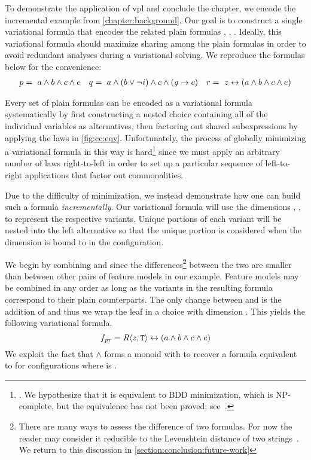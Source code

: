 \label{section:vpl:example}
%
To demonstrate the application of \ac{vpl} and conclude the chapter, we encode
the incremental example from \autoref{chapter:background}. Our goal is to
construct a single variational formula that encodes the related plain formulas
\pV{}, \qV{}, \rV{}. Ideally, this variational formula should maximize sharing
among the plain formulas in order to avoid redundant analyses during a
variational solving. We reproduce the formulas below for the convenience:
%
\begin{align*}
  p =\ a \wedge b \wedge c \wedge e && q=\ a \wedge (b \vee \neg \mathit{i}{}) \wedge c \wedge (\mathit{g}{} \rightarrow c) && r =~z \leftrightarrow (a \wedge b \wedge c \wedge e)
\end{align*}

%
Every set of plain formulas can be encoded as a variational formula
systematically by first constructing a nested choice containing all of the
individual variables as alternatives, then factoring out shared subexpressions
by applying the laws in \autoref{fig:cc:eqv}.
%
Unfortunately, the process of globally minimizing a variational formula in this
way is hard\footnote{\label{vpl:bdd}. We hypothesize that it is equivalent to
  BDD minimization, which is NP-complete, but the equivalence has not been
  proved; see~\cite{Walk14onward}.} since we must apply an arbitrary number of
laws right-to-left in order to set up a particular sequence of left-to-right
applications that factor out commonalities.

Due to the difficulty of minimization, we instead demonstrate how one can build
such a formula \emph{incrementally}.
%
Our variational formula will use the dimensions \dimP, \dimQ, \dimR{} to
represent the respective variants. Unique portions of each variant will be
nested into the left alternative so that the unique portion is considered when
the dimension is bound to \true in the configuration.

%
We begin by combining \pV{} and \rV{} since the differences\footnote{There are many ways to assess the difference of two
  formulas. For now the reader may consider it reducible to the Levenshtein
  distance of two strings~\cite{Levenshtein_SPD66}. We return to this discussion
  in \autoref{section:conclusion:future-work}} between the two are smaller than
between other pairs of feature models in our example. Feature models may be
combined in any order as long as the variants in the resulting formula
correspond to their plain counterparts. The only change between \pV{} and \rV{}
is the addition of \zV{} and thus we wrap the leaf in a choice with dimension
\dimR. This yields the following variational formula.
%
\begin{equation*}
  f_{\pV\rV} = \chc[\dimR]{\zV, \tru{}} \leftrightarrow (a \wedge b \wedge c \wedge e)
\end{equation*}
%
%
We exploit the fact that $\wedge$ forms a monoid with \tru{} to recover a
formula equivalent to \pV{} for configurations where \dimR{} is \false.


